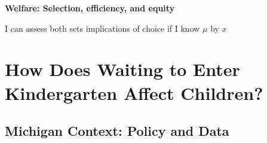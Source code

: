 \documentclass[t,aspectratio=169,11pt,presentation]{beamer}
\newenvironment{wideitemize}{\itemize\addtolength{\itemsep}{14pt}}{\enditemize}
\begin{document}
\begin{frame}[label=wait3]{\textbf{Welfare: Selection, efficiency, and equity}}
\begin{wideitemize}
			\item<6> I can assess both sets implications of choice if I know $\mu$ by $x$
			
			
		\end{wideitemize}
		\vspace{4em}
		\hyperlink{narratives}{}    
	\end{frame}




\section{How Does Waiting to Enter Kindergarten Affect Children?}
\subsection{Michigan Context: Policy and Data}
\end{document}
